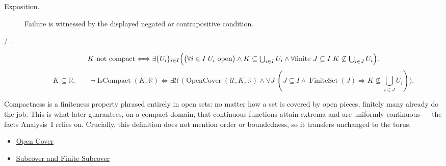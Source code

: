 \begin{remark*}
\begin{description}
  \item[Exposition.]
  Failure is witnessed by the displayed negated or contrapositive condition.

  \item[ / .]
  \[
K \text{ not compact} \Longleftrightarrow \exists \{U_i\}_{i\in I}\Bigl(\bigl(\forall i\in I\;U_i \text{ open}\bigr)\land K\subseteq\textstyle\bigcup_{i\in I}U_i \land \forall \text{finite } J\subseteq I\;K\not\subseteq\textstyle\bigcup_{i\in J}U_i\Bigr).
\]
\[
K\subseteq\mathbb{R},\qquad
\neg\operatorname{IsCompact}(K,\mathbb{R})
\Longleftrightarrow
\exists \mathcal{U}\;\bigl(\operatorname{OpenCover}(\mathcal{U},K,\mathbb{R})
\land \forall J\;(J\subseteq I\land \operatorname{FiniteSet}(J)
\Longrightarrow K\not\subseteq\textstyle\bigcup_{i\in J}U_i)\bigr).
\]
\end{description}
\end{remark*}
\begin{remark*}[Interpretation]
Compactness is a finiteness property phrased entirely in open sets: no matter how a set is covered by open pieces, finitely many already do the job. This is what later guarantees, on a compact domain, that continuous functions attain extrema and are uniformly continuous --- the facts Analysis~I relies on. Crucially, this definition does not mention order or boundedness, so it transfers unchanged to the torus.
\end{remark*}
\begin{dependencies}
\begin{itemize}
  \item \hyperref[def:real-open-cover]{Open Cover}
  \item \hyperref[def:finite-subcover]{Subcover and Finite Subcover}
\end{itemize}
\end{dependencies}
